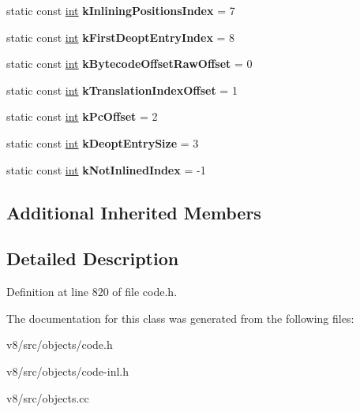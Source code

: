\begin{DoxyCompactItemize}
static const \mbox{\hyperlink{classint}{int}} {\bfseries k\+Inlining\+Positions\+Index} = 7
\item 
\mbox{\label{classv8_1_1internal_1_1DeoptimizationData_afd017ea62745d74a47535c286e3cd37c}} 
static const \mbox{\hyperlink{classint}{int}} {\bfseries k\+First\+Deopt\+Entry\+Index} = 8
\item 
\mbox{\label{classv8_1_1internal_1_1DeoptimizationData_a3c730ab7058ed9644bc997ec53720021}} 
static const \mbox{\hyperlink{classint}{int}} {\bfseries k\+Bytecode\+Offset\+Raw\+Offset} = 0
\item 
\mbox{\label{classv8_1_1internal_1_1DeoptimizationData_ad4121b67c06ab27dd613e8b467bd70d7}} 
static const \mbox{\hyperlink{classint}{int}} {\bfseries k\+Translation\+Index\+Offset} = 1
\item 
\mbox{\label{classv8_1_1internal_1_1DeoptimizationData_aa787a7adcb99033852ae022fa8aa396b}} 
static const \mbox{\hyperlink{classint}{int}} {\bfseries k\+Pc\+Offset} = 2
\item 
\mbox{\label{classv8_1_1internal_1_1DeoptimizationData_a565e78129c3b05640982f0480189379e}} 
static const \mbox{\hyperlink{classint}{int}} {\bfseries k\+Deopt\+Entry\+Size} = 3
\item 
\mbox{\label{classv8_1_1internal_1_1DeoptimizationData_a669339f300d550b70e64469611187bf4}} 
static const \mbox{\hyperlink{classint}{int}} {\bfseries k\+Not\+Inlined\+Index} = -\/1
\end{DoxyCompactItemize}
\subsection*{Additional Inherited Members}


\subsection{Detailed Description}


Definition at line 820 of file code.\+h.



The documentation for this class was generated from the following files\+:\begin{DoxyCompactItemize}
\item 
v8/src/objects/code.\+h\item 
v8/src/objects/code-\/inl.\+h\item 
v8/src/objects.\+cc\end{DoxyCompactItemize}
